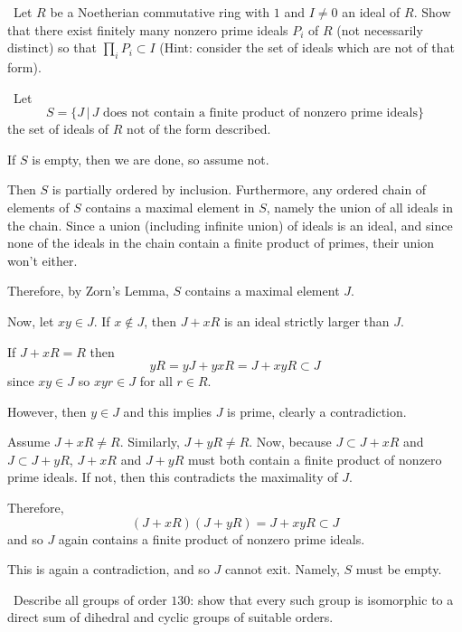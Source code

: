 \documentclass[12pt]{Qual}
\begin{document}
\begin{problem} $\,$
Let $R$ be a Noetherian commutative ring with $1$ and $I\not=0$ an ideal of $R$. Show that there exist finitely many nonzero prime ideals $P_i$ of $R$ (not necessarily distinct) so that $\prod_iP_i\subset I$ (Hint: consider the set of ideals which are not of that form).
\end{problem}


\begin{solution}$\,$
Let $$S=\{J\,|\, J\text{ does not contain a finite product of nonzero prime ideals}\}$$ the set of ideals of $R$ not of the form described.

If $S$ is empty, then we are done, so assume not.

Then $S$ is partially ordered by inclusion. Furthermore, any ordered chain of elements of $S$ contains a maximal element in $S$, namely the union of all ideals in the chain. Since a union (including infinite union) of ideals is an ideal, and since none of the ideals in the chain contain a finite product of primes, their union won't either.

Therefore, by Zorn's Lemma, $S$ contains a maximal element $J$.

Now, let $xy\in J$. If $x\notin J$, then $J+xR$ is an ideal strictly larger than $J$.

If $J+xR=R$ then $$yR=yJ+yxR=J+xyR\subset J$$ since $xy\in J$ so $xyr\in J$ for all $r\in R$.

However, then $y\in J$ and this implies $J$ is prime, clearly a contradiction.

Assume $J+xR\not=R$. Similarly, $J+yR\not=R$. Now, because $J\subset J+xR$ and $J\subset J+yR$, $J+xR$ and $J+yR$ must both contain a finite product of nonzero prime ideals. If not, then this contradicts the maximality of $J$.

Therefore, $$(J+xR)(J+yR)=J+xyR\subset J$$ and so $J$ again contains a finite product of nonzero prime ideals.

This is again a contradiction, and so $J$ cannot exit. Namely, $S$ must be empty.
\end{solution}
\newpage


\begin{problem} $\,$
Describe all groups of order $130$: show that every such group is isomorphic to a direct sum of dihedral and cyclic groups of suitable orders.
\end{problem}
\end{document}

